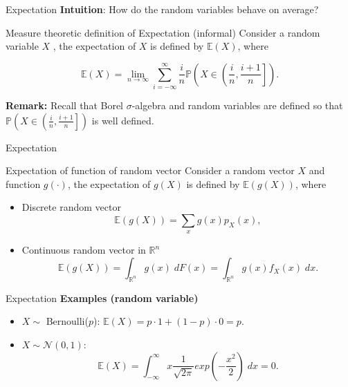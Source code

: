 \documentclass [aspectratio=169]{beamer}
\begin{document}
\begin{frame}{Expectation}
\textbf{Intuition}: How do the random variables behave on average?\\

\begin{block}{Measure theoretic definition of Expectation (informal)}
Consider a random variable $X$ , the expectation of $X$ is defined by $\mathbb{E}(X)$, where 

\[
\mathbb{E}(X) = \lim_{n\to \infty} \sum_{i=-\infty}^\infty \frac{i}{n}\mathbb{P}\left(X \in \left(\frac{i}{n}, \frac{i+1}{n}\right]\right).
\]
\end{block}

\textbf{Remark:} Recall that Borel $\sigma$-algebra and random variables are defined so that $\mathbb{P}\left(X \in \left(\frac{i}{n}, \frac{i+1}{n}\right]\right)$ is well defined.
\end{frame}


\begin{frame}{Expectation}

\begin{block}{Expectation of function of random vector}
Consider a random vector $X$ and function $g(\cdot)$, the expectation of $g(X)$ is defined by $\mathbb{E}(g(X))$, where 
\begin{itemize}
    \item Discrete random vector
    $$
    \mathbb{E}(g(X)) = \sum_{x}g(x)p_X(x),
    $$
    \item Continuous random vector in $\mathbb{R}^n$
    $$
    \mathbb{E}(g(X)) = \int_{\mathbb{R}^n} g(x)\;dF(x) = \int_{\mathbb{R}^n} g(x)f_X(x)\;dx.
    $$
\end{itemize}
\end{block}
\end{frame}

\begin{frame}{Expectation}
    \textbf{Examples (random variable)}
    \begin{itemize}
        \item $X \sim $ Bernoulli($p$): $\mathbb{E}(X) = p\cdot 1 + (1-p)\cdot 0 = p$.
        \item $X \sim \mathcal{N}(0, 1)$: 
        $$
        \mathbb{E}(X) = \int_{-\infty}^{\infty}x 
        \frac{1}{\sqrt{2\pi}}exp(-\frac{x^2}{2})\; dx = 0.
        $$
    \end{itemize}
    \vspace{0.1in}
\end{frame}
\end{document}
